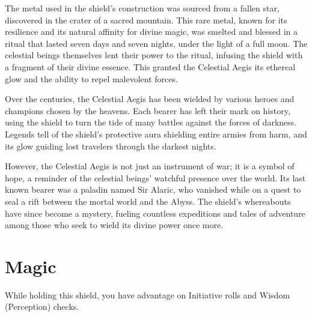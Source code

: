The metal used in the shield's construction was sourced from a fallen star, discovered in the crater of a sacred mountain. This rare metal, known for its resilience and its natural affinity for divine magic, was smelted and blessed in a ritual that lasted seven days and seven nights, under the light of a full moon. The celestial beings themselves lent their power to the ritual, infusing the shield with a fragment of their divine essence. This granted the Celestial Aegis its ethereal glow and the ability to repel malevolent forces.

Over the centuries, the Celestial Aegis has been wielded by various heroes and champions chosen by the heavens. Each bearer has left their mark on history, using the shield to turn the tide of many battles against the forces of darkness. Legends tell of the shield's protective aura shielding entire armies from harm, and its glow guiding lost travelers through the darkest nights.

However, the Celestial Aegis is not just an instrument of war; it is a symbol of hope, a reminder of the celestial beings' watchful presence over the world. Its last known bearer was a paladin named Sir Alaric, who vanished while on a quest to seal a rift between the mortal world and the Abyss. The shield's whereabouts have since become a mystery, fueling countless expeditions and tales of adventure among those who seek to wield its divine power once more.

\section*{Magic}
While holding this shield, you have advantage on Initiative rolls and Wisdom (Perception) checks.